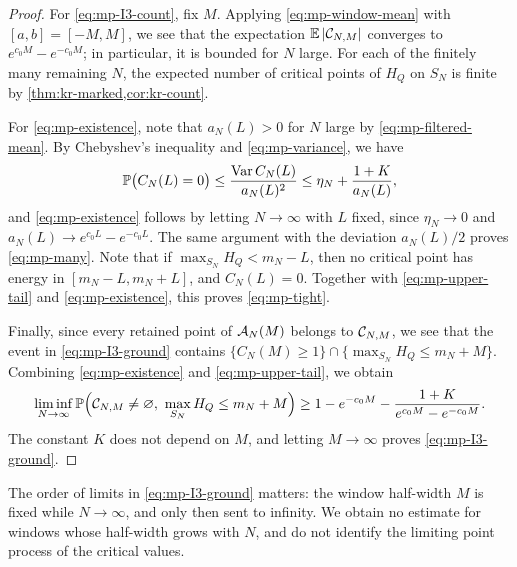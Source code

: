 \begin{proof}
For \eqref{eq:mp-I3-count}, fix $M$. Applying \eqref{eq:mp-window-mean} with $[a,b]=[-M,M]$, we see that the expectation $\mathbb E\left|\mathcal C_{N,M}\right|$ converges to $e^{c_0M}-e^{-c_0M}$; in particular, it is bounded for $N$ large. For each of the finitely many remaining $N$, the expected number of critical points of $H_Q$ on $S_N$ is finite by \cref{thm:kr-marked,cor:kr-count}.

For \eqref{eq:mp-existence}, note that $a_N(L)>0$ for $N$ large by \eqref{eq:mp-filtered-mean}. By Chebyshev's inequality and \eqref{eq:mp-variance}, we have
\[
\mathbb P\bigl(C_N(L)=0\bigr)\le\frac{\operatorname{Var} C_N(L)}{a_N(L)^2}\le\eta_N+\frac{1+K}{a_N(L)},
\]
and \eqref{eq:mp-existence} follows by letting $N\to\infty$ with $L$ fixed, since $\eta_N\to0$ and $a_N(L)\to e^{c_0L}-e^{-c_0L}$. The same argument with the deviation $a_N(L)/2$ proves \eqref{eq:mp-many}. Note that if $\max_{S_N}H_Q<m_N-L$, then no critical point has energy in $[m_N-L,m_N+L]$, and $C_N(L)=0$. Together with \eqref{eq:mp-upper-tail} and \eqref{eq:mp-existence}, this proves \eqref{eq:mp-tight}.

Finally, since every retained point of $\mathcal A_N(M)$ belongs to $\mathcal C_{N,M}$, we see that the event in \eqref{eq:mp-I3-ground} contains $\{C_N(M)\ge1\}\cap\{\max_{S_N}H_Q\le m_N+M\}$. Combining \eqref{eq:mp-existence} and \eqref{eq:mp-upper-tail}, we obtain
\[
\liminf_{N\to\infty}\Pp\Bigl(\cC_{N,M}\ne\varnothing,\ \max_{S_N}H_Q\le m_N+M\Bigr)\ge1-e^{-c_0M}-\frac{1+K}{e^{c_0M}-e^{-c_0M}}.
\]
The constant $K$ does not depend on $M$, and letting $M\to\infty$ proves \eqref{eq:mp-I3-ground}.
\end{proof}

The order of limits in \eqref{eq:mp-I3-ground} matters: the window half-width $M$ is fixed while $N\to\infty$, and only then sent to infinity. We obtain no estimate for windows whose half-width grows with $N$, and do not identify the limiting point process of the critical values.
